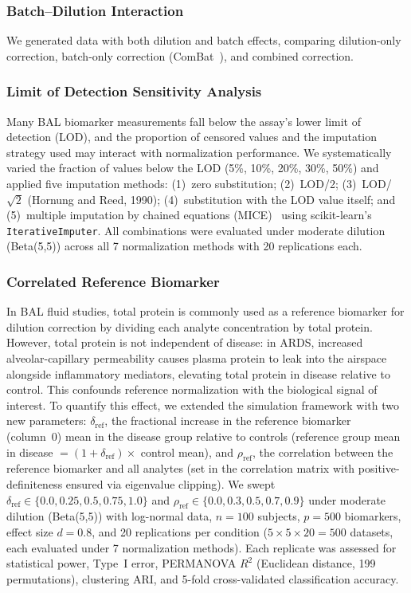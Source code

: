 \documentclass[12pt]{article}
\begin{document}
\subsubsection{Batch--Dilution Interaction}

We generated data with both dilution and batch effects, comparing dilution-only correction, batch-only correction (ComBat~\cite{Johnson2007}), and combined correction.

\subsubsection{Limit of Detection Sensitivity Analysis}

Many BAL biomarker measurements fall below the assay's lower limit of detection (LOD), and the proportion of censored values and the imputation strategy used may interact with normalization performance. We systematically varied the fraction of values below the LOD (5\%, 10\%, 20\%, 30\%, 50\%) and applied five imputation methods: (1)~zero substitution; (2)~LOD/2; (3)~LOD/$\sqrt{2}$ (Hornung and Reed, 1990); (4)~substitution with the LOD value itself; and (5)~multiple imputation by chained equations (MICE)~\cite{vanBuuren2011} using scikit-learn's \texttt{IterativeImputer}. All combinations were evaluated under moderate dilution (Beta(5,5)) across all 7 normalization methods with 20 replications each.

\subsubsection{Correlated Reference Biomarker}

In BAL fluid studies, total protein is commonly used as a reference biomarker for dilution correction by dividing each analyte concentration by total protein. However, total protein is not independent of disease: in ARDS, increased alveolar-capillary permeability causes plasma protein to leak into the airspace alongside inflammatory mediators, elevating total protein in disease relative to control. This confounds reference normalization with the biological signal of interest. To quantify this effect, we extended the simulation framework with two new parameters: $\delta_{\text{ref}}$, the fractional increase in the reference biomarker (column~0) mean in the disease group relative to controls (reference group mean in disease $= (1 + \delta_{\text{ref}}) \times$ control mean), and $\rho_{\text{ref}}$, the correlation between the reference biomarker and all analytes (set in the correlation matrix with positive-definiteness ensured via eigenvalue clipping). We swept $\delta_{\text{ref}} \in \{0.0, 0.25, 0.5, 0.75, 1.0\}$ and $\rho_{\text{ref}} \in \{0.0, 0.3, 0.5, 0.7, 0.9\}$ under moderate dilution (Beta(5,5)) with log-normal data, $n = 100$ subjects, $p = 500$ biomarkers, effect size $d = 0.8$, and 20 replications per condition ($5 \times 5 \times 20 = 500$ datasets, each evaluated under 7 normalization methods). Each replicate was assessed for statistical power, Type~I error, PERMANOVA $R^2$ (Euclidean distance, 199 permutations), clustering ARI, and 5-fold cross-validated classification accuracy.
\end{document}
